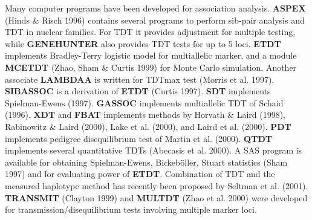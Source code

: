 Many computer programs have been developed for association analysis.  {\bf
ASPEX} (Hinds \& Risch 1996) contains several programs to perform sib-pair
analysis and TDT in nuclear families.  For TDT it provides adjustment for
multiple testing, while {\bf GENEHUNTER} also provides TDT tests for up to 5
loci.  {\bf ETDT} implements Bradley-Terry logistic model for multiallelic
marker, and a module {\bf MCETDT} (Zhao, Sham \& Curtis 1999) for Monte Carlo
simulation.  Another associate {\bf LAMBDAA} is written for TDTmax test (Morris
et al.  1997).  {\bf SIBASSOC} is a derivation of {\bf ETDT} (Curtis 1997).
{\bf SDT} implements Spielman-Ewens (1997).  {\bf GASSOC} implements
multiallelic TDT of Schaid (1996).  {\bf XDT} and {\bf FBAT} implements methods
by Horvath \& Laird (1998), Rabinowitz \& Laird (2000), Lake et al.  (2000),
and Laird et al.  (2000).  {\bf PDT} implements pedigree disequilibrium test of
Martin et al.  (2000).  {\bf QTDT} implements several quantitative TDTs
(Abecasis et al.  2000).  A SAS program is available for obtaining
Spielman-Ewens, Bickeb\"{o}ller, Stuart statistics (Sham 1997) and for
evaluating power of {\bf ETDT}.  Combination of TDT and the measured haplotype
method has recently been proposed by Seltman et al.  (2001).  {\bf TRANSMIT}
(Clayton 1999) and {\bf MULTDT} (Zhao et al.  2000) were developed for
transmission/disequilibrium tests involving multiple marker loci.

